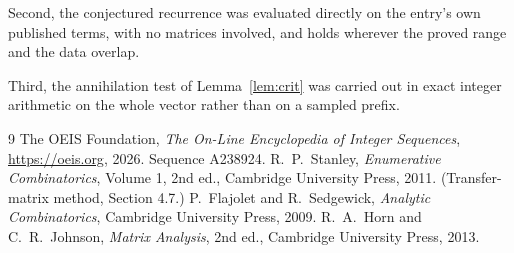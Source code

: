 \documentclass[11pt,a4paper]{article}
\theoremstyle{plain}
\theoremstyle{definition}
\begin{document}
Second, the conjectured recurrence was evaluated directly on the entry's own published terms,
with no matrices involved, and holds wherever the proved range and the data overlap.

Third, the annihilation test of Lemma~\ref{lem:crit} was carried out in exact integer
arithmetic on the whole vector rather than on a sampled prefix.

\begin{thebibliography}{9}
 The OEIS Foundation, \emph{The On-Line Encyclopedia of Integer
Sequences}, \url{https://oeis.org}, 2026. Sequence A238924.
 R.~P.~Stanley, \emph{Enumerative Combinatorics}, Volume 1, 2nd ed.,
Cambridge University Press, 2011. (Transfer-matrix method, Section 4.7.)
 P.~Flajolet and R.~Sedgewick, \emph{Analytic Combinatorics}, Cambridge
University Press, 2009.
 R.~A.~Horn and C.~R.~Johnson, \emph{Matrix Analysis}, 2nd ed., Cambridge
University Press, 2013.
\end{thebibliography}
\end{document}
